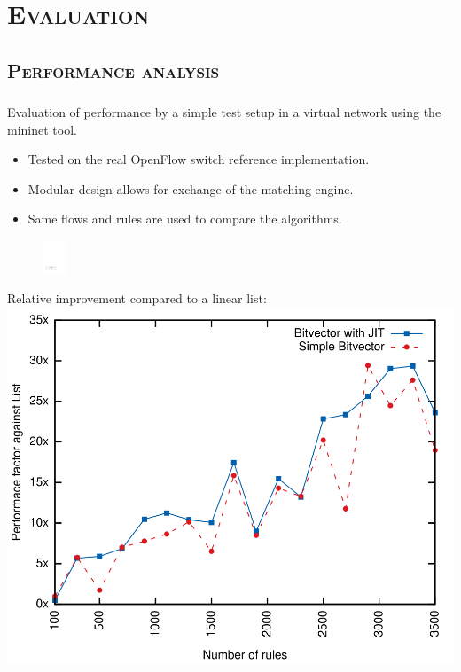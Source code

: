\documentclass[xcolor=x11names,compress]{beamer}
\renewcommand{\(}{\begin{columns}}
\renewcommand{\)}{\end{columns}}
\newcommand{\<}[1]{\begin{column}{#1}}
\renewcommand{\>}{\end{column}}
\begin{document}
\section{\scshape Evaluation}
\subsection{\scshape Performance analysis}
\begin{frame}
  \frametitle{\insertsubsection}
  Evaluation of performance by a simple test setup in a virtual network using the \textsf{mininet} tool.
  \begin{itemize}
    \item Tested on the real OpenFlow switch reference implementation.
    \item Modular design allows for exchange of the matching engine.
    \item Same flows and rules are used to compare the algorithms.
  \end{itemize}
  \begin{figure}
  \centering
  \includegraphics[height=1cm]{figures/ofswitch-perftest}
  \end{figure}
\end{frame}

\begin{frame}
  Relative improvement compared to a linear list:
  \includegraphics[height=0.9\textheight]{figures/eval_w_relative}
\end{frame}
\end{document}
